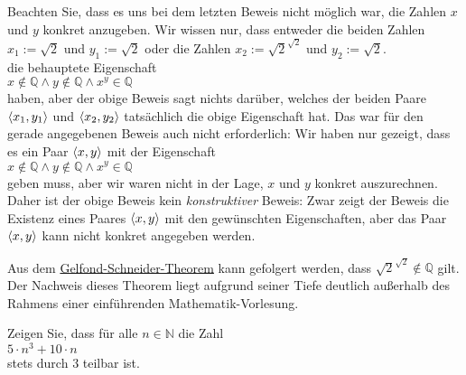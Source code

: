 Beachten Sie, dass es uns bei dem letzten Beweis nicht möglich war, die Zahlen $x$ und $y$ konkret
anzugeben.  Wir wissen nur, dass entweder die beiden Zahlen
\\[0.2cm]
\hspace*{1.3cm}
$x_1 := \sqrt{2}$ und $y_1 := \sqrt{2}$ \quad oder \quad die Zahlen $x_2 := \sqrt{2}^{\sqrt{2}}$ und $y_2 := \sqrt{2}$.
\\[0.2cm]
die behauptete Eigenschaft 
\\[0.2cm]
\hspace*{1.3cm}
$x \not\in \mathbb{Q} \wedge y \not\in \mathbb{Q} \wedge x^y \in \mathbb{Q}$
\\[0.2cm]
haben, aber der obige Beweis sagt nichts darüber, welches der beiden Paare $\pair(x_1,y_1)$ und
$\pair(x_2,y_2)$ tatsächlich die obige Eigenschaft hat.  Das war für den gerade angegebenen Beweis
auch nicht erforderlich: Wir haben nur gezeigt, dass es ein Paar $\pair(x,y)$ mit der Eigenschaft
\\[0.2cm]
\hspace*{1.3cm}
$x \not\in \mathbb{Q} \wedge y \not\in \mathbb{Q} \wedge x^y \in \mathbb{Q}$
\\[0.2cm]
geben muss, aber wir waren nicht in der Lage, $x$ und $y$ konkret auszurechnen.  Daher ist der obige
Beweis kein \emph{konstruktiver} Beweis:  Zwar zeigt der Beweis die Existenz eines Paares
$\pair(x,y)$ mit den gewünschten Eigenschaften, aber das Paar $\pair(x,y)$ kann nicht konkret
angegeben werden.

\remark
Aus dem \href{http://en.wikipedia.org/wiki/Gelfond%27s_theorem}{Gelfond-Schneider-Theorem}
kann gefolgert werden, dass $\sqrt{2}^{\sqrt{2}} \not\in \mathbb{Q}$ gilt.  Der Nachweis dieses
Theorem liegt aufgrund seiner Tiefe deutlich außerhalb des Rahmens einer einführenden Mathematik-Vorlesung.

\exercise
Zeigen Sie, dass für alle $n \in \mathbb{N}$ die Zahl
\\[0.2cm]
\hspace*{1.3cm}
$5 \cdot n^3 + 10 \cdot n$
\\[0.2cm]
stets durch $3$ teilbar ist.  \exend

%
%


